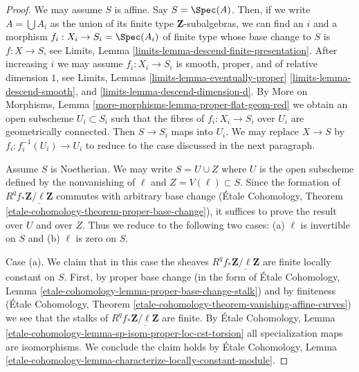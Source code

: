 \begin{proof}
We may assume $S$ is affine. Say $S = \Spec(A)$. Then, if we write
$A = \bigcup A_i$ as the union of its finite type $\mathbf{Z}$-subalgebras,
we can find an $i$ and a morphism $f_i : X_i \to S_i = \Spec(A_i)$ of finite
type whose base change to $S$ is $f : X \to S$, see
Limits, Lemma \ref{limits-lemma-descend-finite-presentation}.
After increasing $i$ we may assume $f_i : X_i \to S_i$ is
smooth, proper, and of relative dimension $1$, see
Limits, Lemmas
\ref{limits-lemma-eventually-proper}
\ref{limits-lemma-descend-smooth}, and
\ref{limits-lemma-descend-dimension-d}.
By More on Morphisms, Lemma \ref{more-morphisms-lemma-proper-flat-geom-red}
we obtain an open subscheme $U_i \subset S_i$ such that the fibres
of $f_i : X_i \to S_i$ over $U_i$ are geometrically connected.
Then $S \to S_i$ maps into $U_i$. We may replace $X \to S$
by $f_i : f_i^{-1}(U_i) \to U_i$ to reduce to the case
discussed in the next paragraph.

\medskip\noindent
Assume $S$ is Noetherian. We may write $S = U \cup Z$ where $U$ is the
open subscheme defined by the nonvanishing of $\ell$ and
$Z = V(\ell) \subset S$. Since the formation of
$R^qf_*\underline{\mathbf{Z}/\ell\mathbf{Z}}$ commutes with arbitrary
base change (\'Etale Cohomology, Theorem
\ref{etale-cohomology-theorem-proper-base-change}),
it suffices to prove the result over $U$ and over $Z$.
Thus we reduce to the following two cases: (a) $\ell$
is invertible on $S$ and (b) $\ell$ is zero on $S$.

\medskip\noindent
Case (a). We claim that in this case the sheaves
$R^qf_*\underline{\mathbf{Z}/\ell\mathbf{Z}}$ are
finite locally constant on $S$. First, by proper base change
(in the form of \'Etale Cohomology, Lemma
\ref{etale-cohomology-lemma-proper-base-change-stalk})
and by finiteness
(\'Etale Cohomology, Theorem
\ref{etale-cohomology-theorem-vanishing-affine-curves})
we see that the stalks of $R^qf_*\underline{\mathbf{Z}/\ell\mathbf{Z}}$
are finite. By \'Etale Cohomology, Lemma
\ref{etale-cohomology-lemma-sp-isom-proper-loc-cst-torsion}
all specialization maps are isomorphisms.
We conclude the claim holds by
\'Etale Cohomology, Lemma
\ref{etale-cohomology-lemma-characterize-locally-constant-module}.


\end{proof}
